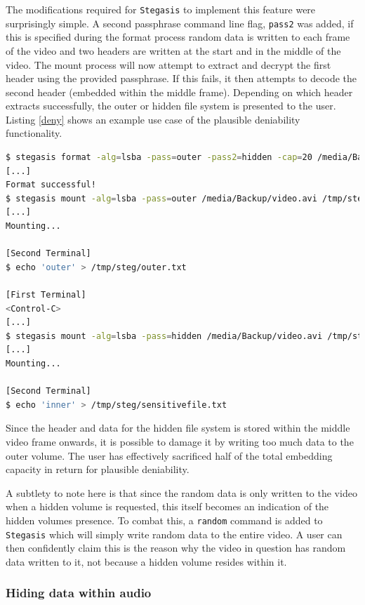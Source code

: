 \documentclass[paper=a4, fontsize=11pt,twoside]{scrartcl}
\numberwithin{table}{section}
\numberwithin{figure}{section}
\numberwithin{algorithm}{section}
\begin{document}
The modifications required for \texttt{Stegasis} to implement this feature were surprisingly simple. A second passphrase command line flag, \texttt{pass2} was added, if this is specified during the format process random data is written to each frame of the video and two headers are written at the start and in the middle of the video. The mount process will now attempt to extract and decrypt the first header using the provided passphrase. If this fails, it then attempts to decode the second header (embedded within the middle frame). Depending on which header extracts successfully, the outer or hidden file system is presented to the user. Listing \ref{deny} shows an example use case of the plausible deniability functionality.

\begin{lstlisting}[language=bash,caption={\texttt{Stegasis} plausible deniability functionality.}, frame=single, label=deny,float,floatplacement=!htb]
$ stegasis format -alg=lsba -pass=outer -pass2=hidden -cap=20 /media/Backup/video.avi
[...]
Format successful!
$ stegasis mount -alg=lsba -pass=outer /media/Backup/video.avi /tmp/steg
[...]
Mounting...

[Second Terminal]
$ echo 'outer' > /tmp/steg/outer.txt

[First Terminal]
<Control-C>
[...]
$ stegasis mount -alg=lsba -pass=hidden /media/Backup/video.avi /tmp/steg
[...]
Mounting...

[Second Terminal]
$ echo 'inner' > /tmp/steg/sensitivefile.txt
\end{lstlisting}

Since the header and data for the hidden file system is stored within the middle video frame onwards, it is possible to damage it by writing too much data to the outer volume. The user has effectively sacrificed half of the total embedding capacity in return for plausible deniability.

A subtlety to note here is that since the random data is only written to the video when a hidden volume is requested, this itself becomes an indication of the hidden volumes presence. To combat this, a \texttt{random} command is added to \texttt{Stegasis} which will simply write random data to the entire video. A user can then confidently claim this is the reason why the video in question has random data written to it, not because a hidden volume resides within it. 

\subsubsection{Hiding data within audio}
\end{document}

